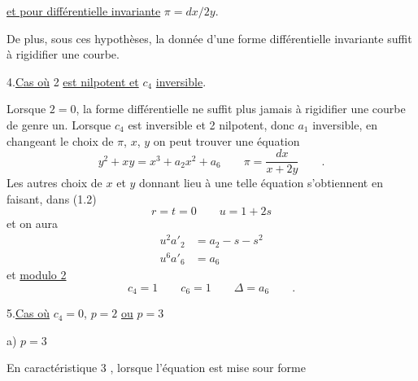 \uline{et pour différentielle invariante} $\pi=dx/2y$.

De plus, sous ces hypothèses, la donnée d'une forme différentielle invariante suffit à rigidifier une courbe.

4.\qquad \uline{Cas où} 2 \uline{est nilpotent et} $c_4$ \uline{inversible}.

Lorsque $2=0$, la forme différentielle ne suffit plus jamais à rigidifier une courbe de genre un. Lorsque $c_4$ est inversible et 2 nilpotent, donc $a_1$ inversible, en changeant le choix de $\pi$, $x$, $y$ on peut trouver une équation
\[
y^2+xy=x^3+a_2x^2+a_6\qquad \pi=\frac{dx}{x+2y}\qquad .\tag*{(4.1)}
\]
Les autres choix de $x$ et $y$ donnant lieu à une telle équation s'obtiennent en faisant, dans (1.2)
\[
r=t=0\qquad u=1+2s\tag*{(4.2)}
\]
et on aura
\[
\begin{aligned}
u^2a'_2&=a_2-s-s^2\\
u^6a'_6&=a_6
\end{aligned}\tag*{(4.3)}
\]
et \uline{modulo 2}
\[
c_4=1\qquad c_6=1\qquad \Delta=a_6\qquad .\tag*{(4.4)}
\]

5.\qquad \uline{Cas où} $c_4=0$, $p=2$ \uline{ou} $p=3$

a) $p=3$

En caractéristique 3 , lorsque l'équation est mise sour forme

